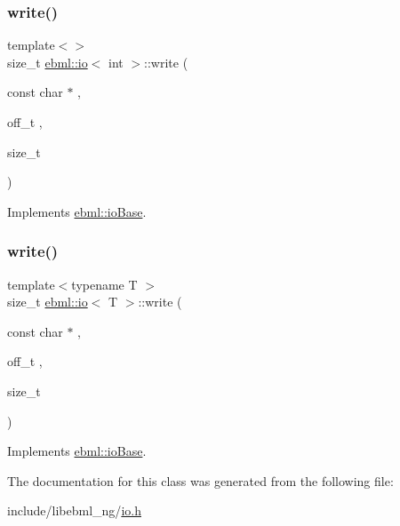 \mbox{\label{classebml_1_1io_aedbdf5a69ee0ae64f909a59645cd0db7}} 
\subsubsection{\texorpdfstring{write()}{write()}\hspace{0.1cm}{\footnotesize\ttfamily [1/2]}}
{\footnotesize\ttfamily template$<$$>$ \\
size\+\_\+t \mbox{\hyperlink{classebml_1_1io}{ebml\+::io}}$<$ int $>$\+::write (\begin{DoxyParamCaption}\item[{const char $\ast$}]{,  }\item[{off\+\_\+t}]{,  }\item[{size\+\_\+t}]{ }\end{DoxyParamCaption})\hspace{0.3cm}{\ttfamily [virtual]}}



Implements \mbox{\hyperlink{classebml_1_1ioBase_ad4a000de5db86375be0bf338130f76c9}{ebml\+::io\+Base}}.

\mbox{\label{classebml_1_1io_a5c3f2df6edfbd090b4d0fbc8a6dacccb}} 
\subsubsection{\texorpdfstring{write()}{write()}\hspace{0.1cm}{\footnotesize\ttfamily [2/2]}}
{\footnotesize\ttfamily template$<$typename T $>$ \\
size\+\_\+t \mbox{\hyperlink{classebml_1_1io}{ebml\+::io}}$<$ T $>$\+::write (\begin{DoxyParamCaption}\item[{const char $\ast$}]{,  }\item[{off\+\_\+t}]{,  }\item[{size\+\_\+t}]{ }\end{DoxyParamCaption})\hspace{0.3cm}{\ttfamily [virtual]}}



Implements \mbox{\hyperlink{classebml_1_1ioBase_ad4a000de5db86375be0bf338130f76c9}{ebml\+::io\+Base}}.



The documentation for this class was generated from the following file\+:\begin{DoxyCompactItemize}
\item 
include/libebml\+\_\+ng/\mbox{\hyperlink{io_8h}{io.\+h}}\end{DoxyCompactItemize}
